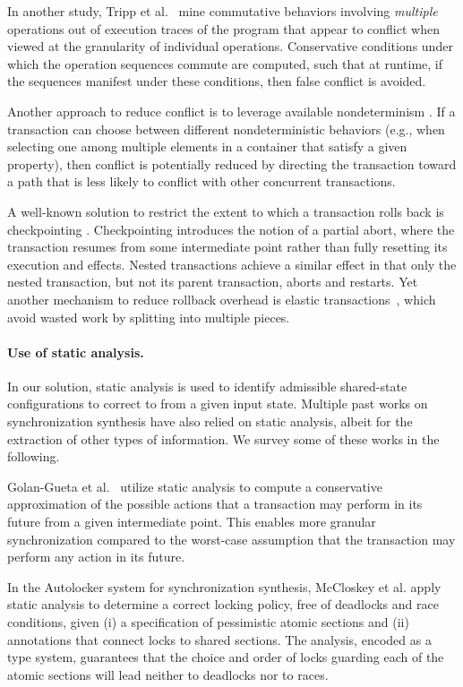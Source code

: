 In another study, Tripp et al.~\cite{TMFS:PLDI12} mine commutative behaviors involving \emph{multiple} operations out of execution traces of the program that appear to conflict when viewed at the granularity of individual operations. Conservative conditions under which the operation sequences commute are computed, such that at runtime, if the sequences manifest under these conditions, then false conflict is avoided.

Another approach to reduce conflict is to leverage available nondeterminism \cite{TKS:OOPSLA13}. If a transaction can choose between different nondeterministic behaviors (e.g., when selecting one among multiple elements in a container that satisfy a given property), then conflict is potentially reduced by directing the transaction toward a path that is less likely to conflict with other concurrent transactions.

A well-known solution to restrict the extent to which a transaction rolls back is checkpointing \cite{spaa08a,Egwutuoha:2013}. Checkpointing introduces the notion of a partial abort, where the transaction resumes from some intermediate point rather than fully resetting its execution and effects. Nested transactions \cite{ont,beeri} achieve a similar effect in that only the nested transaction, but not its parent transaction, aborts and restarts. Yet another mechanism to reduce rollback overhead is elastic transactions~\cite{FGG:DISC09}, which avoid wasted work by splitting into multiple pieces.  

\paragraph{Use of static analysis.} In our solution, static analysis is used to identify admissible shared-state configurations to correct to from a given input state. Multiple past works on synchronization synthesis have also relied on static analysis, albeit for the extraction of other types of information. We survey some of these works in the following.

Golan-Gueta et al.~\cite{GRSY:PLDI13} utilize static analysis to compute a conservative approximation of the possible actions that a transaction may perform in its future from a given intermediate point. This enables more granular synchronization compared to the worst-case assumption that the transaction may perform any action in its future.

In the Autolocker system for synchronization synthesis, McCloskey et al. \cite{popl/McCloskeyZGB06} apply static analysis to determine a correct locking policy, free of deadlocks and race conditions, given (i) a specification of pessimistic atomic sections and (ii) annotations that connect locks to shared sections. The analysis, encoded as a type system, guarantees that the choice and order of locks guarding each of the atomic sections will lead neither to deadlocks nor to races.

